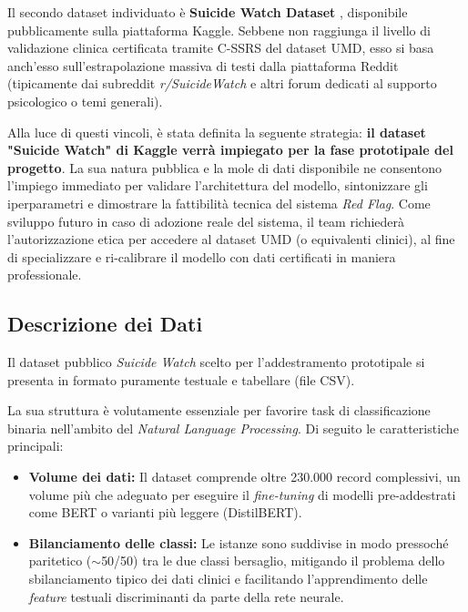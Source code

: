 Il secondo dataset individuato è \textbf{Suicide Watch Dataset} \cite{suicide_watch_dataset}, disponibile pubblicamente sulla piattaforma Kaggle. Sebbene non raggiunga il livello di validazione clinica certificata tramite C-SSRS del dataset UMD, esso si basa anch'esso sull'estrapolazione massiva di testi dalla piattaforma Reddit (tipicamente dai subreddit \textit{r/SuicideWatch} e altri forum dedicati al supporto psicologico o temi generali). 

Alla luce di questi vincoli, è stata definita la seguente strategia: \textbf{il dataset "Suicide Watch" di Kaggle verrà impiegato per la fase prototipale del progetto}. La sua natura pubblica e la mole di dati disponibile ne consentono l'impiego immediato per validare l'architettura del modello, sintonizzare gli iperparametri e dimostrare la fattibilità tecnica del sistema \textit{Red Flag}. Come sviluppo futuro in caso di adozione reale del sistema, il team richiederà l'autorizzazione etica per accedere al dataset UMD (o equivalenti clinici), al fine di specializzare e ri-calibrare il modello con dati certificati in maniera professionale.

\subsection{Descrizione dei Dati}
\label{subsec:descrizione_red_flag}

Il dataset pubblico \textit{Suicide Watch} scelto per l'addestramento prototipale si presenta in formato puramente testuale e tabellare (file CSV). 

La sua struttura è volutamente essenziale per favorire task di classificazione binaria nell'ambito del \textit{Natural Language Processing}. Di seguito le caratteristiche principali:

\begin{itemize}
    \item \textbf{Volume dei dati:} Il dataset comprende oltre 230.000 record complessivi, un volume più che adeguato per eseguire il \textit{fine-tuning} di modelli pre-addestrati come BERT o varianti più leggere (DistilBERT).
    \item \textbf{Bilanciamento delle classi:} Le istanze sono suddivise in modo pressoché paritetico ($\sim$50/50) tra le due classi bersaglio, mitigando il problema dello sbilanciamento tipico dei dati clinici e facilitando l'apprendimento delle \textit{feature} testuali discriminanti da parte della rete neurale.
\end{itemize}

